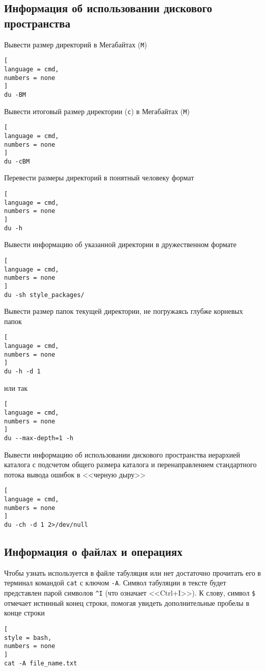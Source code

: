 \documentclass[%
	11pt,
	a4paper,
	utf8,
		]{article}
\begin{document}
\subsection{Информация об использовании дискового пространства}

Вывести размер директорий в Мегабайтах (\texttt{M})
\begin{lstlisting}[
language = cmd,
numbers = none
]
du -BM
\end{lstlisting}

Вывести итоговый размер директории (\texttt{c}) в Мегабайтах (\texttt{M})
\begin{lstlisting}[
language = cmd,
numbers = none
]
du -cBM
\end{lstlisting}

Перевести размеры директорий в понятный человеку формат
\begin{lstlisting}[
language = cmd,
numbers = none
]
du -h
\end{lstlisting}

Вывести информацию об указанной директории в дружественном формате
\begin{lstlisting}[
language = cmd,
numbers = none
]
du -sh style_packages/
\end{lstlisting}

Вывести размер папок текущей директории, не погружаясь глубже корневых папок
\begin{lstlisting}[
language = cmd,
numbers = none
]
du -h -d 1
\end{lstlisting}
или так
\begin{lstlisting}[
language = cmd,
numbers = none
]
du --max-depth=1 -h
\end{lstlisting}

Вывести информацию об использовании дискового пространства иерархией каталога с подсчетом общего размера каталога и перенаправлением стандартного потока вывода ошибок в <<черную дыру>>
\begin{lstlisting}[
language = cmd,
numbers = none
]
du -ch -d 1 2>/dev/null
\end{lstlisting}

\subsection{Информация о файлах и операциях}

Чтобы узнать используется в файле табуляция или нет достаточно прочитать его в терминал командой \texttt{cat} с ключом \verb|-A|. Символ табуляции в тексте будет представлен парой символов \verb|^I| (что означает <<Ctrl+I>>). К слову, символ \verb|$| отмечает истинный конец строки, помогая увидеть дополнительные пробелы в конце строки
\begin{lstlisting}[
style = bash,
numbers = none
]
cat -A file_name.txt
\end{lstlisting}
\end{document}
